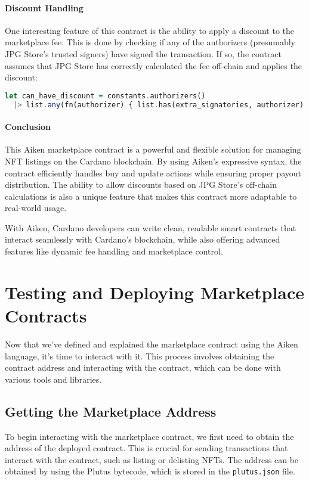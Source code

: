 \paragraph{Discount Handling}
One interesting feature of this contract is the ability to apply a discount to the marketplace fee. This is done by checking if any of the authorizers (presumably JPG Store’s trusted signers) have signed the transaction. If so, the contract assumes that JPG Store has correctly calculated the fee off-chain and applies the discount:

\begin{lstlisting}[language=haskell, caption=Discount Logic in Aiken]
let can_have_discount = constants.authorizers()
  |> list.any(fn(authorizer) { list.has(extra_signatories, authorizer) })
\end{lstlisting}

\paragraph{Conclusion}
This Aiken marketplace contract is a powerful and flexible solution for managing NFT listings on the Cardano blockchain. By using Aiken’s expressive syntax, the contract efficiently handles buy and update actions while ensuring proper payout distribution. The ability to allow discounts based on JPG Store’s off-chain calculations is also a unique feature that makes this contract more adaptable to real-world usage.

With Aiken, Cardano developers can write clean, readable smart contracts that interact seamlessly with Cardano’s blockchain, while also offering advanced features like dynamic fee handling and marketplace control.


\section{Testing and Deploying Marketplace Contracts}

Now that we've defined and explained the marketplace contract using the Aiken language, it's time to interact with it. This process involves obtaining the contract address and interacting with the contract, which can be done with various tools and libraries.

\subsection{Getting the Marketplace Address}

To begin interacting with the marketplace contract, we first need to obtain the address of the deployed contract. This is crucial for sending transactions that interact with the contract, such as listing or delisting NFTs. The address can be obtained by using the Plutus bytecode, which is stored in the \texttt{plutus.json} file.

